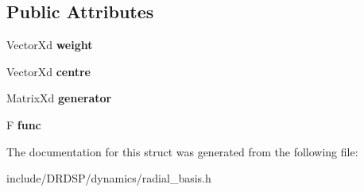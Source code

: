 \subsection*{Public Attributes}
\begin{DoxyCompactItemize}
\item 
\hypertarget{struct_d_r_d_s_p_1_1_equi_r_b_f_cyclic_a6152c13035f77c2978118d61e355ccf8}{Vector\-Xd {\bfseries weight}}\label{struct_d_r_d_s_p_1_1_equi_r_b_f_cyclic_a6152c13035f77c2978118d61e355ccf8}

\item 
\hypertarget{struct_d_r_d_s_p_1_1_equi_r_b_f_cyclic_a50bf2136d3c4d97c309a3895857a7bef}{Vector\-Xd {\bfseries centre}}\label{struct_d_r_d_s_p_1_1_equi_r_b_f_cyclic_a50bf2136d3c4d97c309a3895857a7bef}

\item 
\hypertarget{struct_d_r_d_s_p_1_1_equi_r_b_f_cyclic_aede00a915cd6434e393c2720520e087a}{Matrix\-Xd {\bfseries generator}}\label{struct_d_r_d_s_p_1_1_equi_r_b_f_cyclic_aede00a915cd6434e393c2720520e087a}

\item 
\hypertarget{struct_d_r_d_s_p_1_1_equi_r_b_f_cyclic_a639ef5af751e01e9a7c547d322be6b87}{F {\bfseries func}}\label{struct_d_r_d_s_p_1_1_equi_r_b_f_cyclic_a639ef5af751e01e9a7c547d322be6b87}

\end{DoxyCompactItemize}


The documentation for this struct was generated from the following file\-:\begin{DoxyCompactItemize}
\item 
include/\-D\-R\-D\-S\-P/dynamics/radial\-\_\-basis.\-h\end{DoxyCompactItemize}

